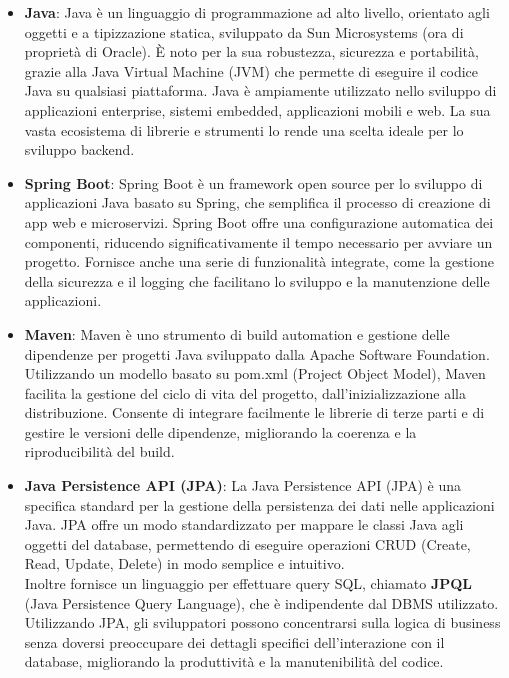 \begin{itemize}
    \item \textbf{Java}: Java è un linguaggio di programmazione ad alto livello, 
    orientato agli oggetti e a tipizzazione statica, sviluppato da 
    Sun Microsystems (ora di proprietà di Oracle). È noto per la sua robustezza, 
    sicurezza e portabilità, grazie alla Java Virtual Machine (JVM) che permette di 
    eseguire il codice Java su qualsiasi piattaforma. Java è ampiamente utilizzato 
    nello sviluppo di applicazioni enterprise, sistemi embedded, applicazioni mobili e web. 
    La sua vasta ecosistema di librerie e strumenti lo rende una scelta ideale per lo sviluppo backend.
    \cite{JavaWikipedia}
 
    \item \textbf{Spring Boot}: Spring Boot è un framework open source 
    per lo sviluppo di applicazioni Java basato su Spring, che semplifica 
    il processo di creazione di app web e microservizi. 
    Spring Boot offre una configurazione automatica dei componenti, 
    riducendo significativamente il tempo necessario per avviare un progetto. Fornisce anche 
    una serie di funzionalità integrate, come la gestione della sicurezza e il logging 
    che facilitano lo sviluppo e la manutenzione delle applicazioni. \cite{MicrosoftSpringBoot}

    \item \textbf{Maven}: Maven è uno strumento di build automation e gestione 
    delle dipendenze per progetti Java sviluppato dalla Apache Software Foundation. 
    Utilizzando un modello basato su pom.xml  (Project Object Model), 
    Maven facilita la gestione del ciclo di vita del progetto, 
    dall'inizializzazione alla distribuzione. Consente di integrare facilmente le librerie 
    di terze parti e di gestire le versioni delle dipendenze, migliorando la coerenza e la 
    riproducibilità del build.
    \cite{MavenNexTre}

    \item \textbf{Java Persistence API (JPA)}: La Java Persistence API (JPA) è una specifica standard 
    per la gestione della persistenza dei dati nelle applicazioni Java. JPA offre un modo standardizzato
    per mappare le classi Java agli oggetti del database, permettendo di eseguire operazioni CRUD 
    (Create, Read, Update, Delete) in modo semplice e intuitivo.
    \\
    Inoltre fornisce un linguaggio per effettuare query SQL, chiamato \textbf{JPQL} 
    (Java Persistence Query Language), che è indipendente dal DBMS utilizzato.
    \\
    Utilizzando JPA, gli sviluppatori possono concentrarsi sulla logica di business senza 
    doversi preoccupare dei dettagli specifici dell'interazione con il database, 
    migliorando la produttività e la manutenibilità del codice.
    \cite{JpaVincenzoRacca}


\end{itemize}
